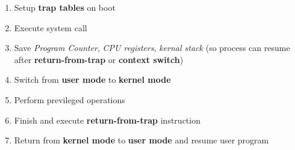 \documentclass[12pt]{article}
\begin{document}
\begin{enumerate}[1.]
\begin{itemize}
\begin{itemize}
            \begin{enumerate}[1)]
                \item Setup \textbf{trap tables} on boot
                \item Execute system call
                \item Save \textit{Program Counter}, \textit{CPU registers}, \textit{kernal stack} (so process can resume after \textbf{return-from-trap}
                or \textbf{context switch})
                \item Switch from \textbf{user mode} to \textbf{kernel mode}
                \item Perform previleged operations
                \item Finish and execute \textbf{return-from-trap} instruction
                \item Return from \textbf{kernel mode} to \textbf{user mode} and resume user program
            \end{enumerate}
        \end{itemize}
    \end{itemize}
\end{enumerate}
\end{document}
